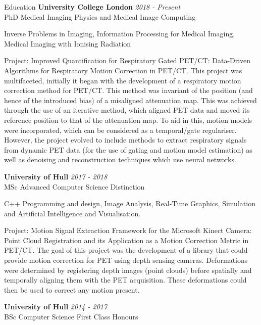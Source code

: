 \documentclass{cv}
\begin{document}
    \begin{rSection}{Education}
        {\bf University College London} \hfill {\em 2018 - Present} 
        \\ PhD Medical Imaging Physics and Medical Image Computing
        
        \item Inverse Problems in Imaging, Information Processing for Medical Imaging, Medical Imaging with Ionising Radiation
        
        \item Project: Improved Quantification for Respiratory Gated PET/CT: Data-Driven Algorithms for Respiratory Motion Correction in PET/CT. This project was multifaceted, initially it began with the development of a respiratory motion correction method for PET/CT. This method was invariant of the position (and hence of the introduced bias) of a misaligned attenuation map. This was achieved through the use of an iterative method, which aligned PET data and moved its reference position to that of the attenuation map. To aid in this, motion models were incorporated, which can be considered as a temporal/gate regulariser. However, the project evolved to include methods to extract respiratory signals from dynamic PET data (for the use of gating and motion model estimation) as well as denoising and reconstruction techniques which use neural networks.
        
        {\bf University of Hull} \hfill {\em 2017 - 2018} 
        \\ MSc Advanced Computer Science \hfill {Distinction}
        
        \item C++ Programming and design, Image Analysis, Real-Time Graphics, Simulation and Artificial Intelligence and Visualisation.
        
        \item Project: Motion Signal Extraction Framework for the Microsoft Kinect Camera: Point Cloud Registration and its Application as a Motion Correction Metric in PET/CT. The goal of this project was the development of a library that could provide motion correction for PET using depth sensing cameras. Deformations were determined by registering depth images (point clouds) before spatially and temporally aligning them with the PET acquisition. These deformations could then be used to correct any motion present.
        
        {\bf University of Hull} \hfill {\em 2014 - 2017} 
        \\ BSc Computer Science \hfill {First Class Honours}
        

\end{rSection}
\end{document}
